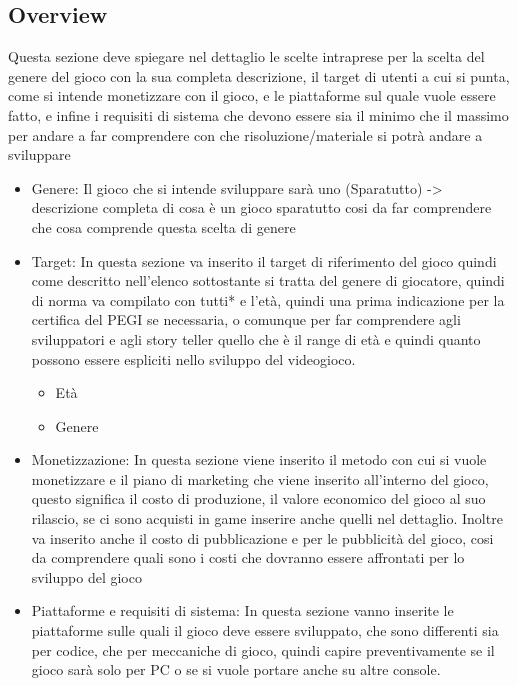 \documentclass{report}
\begin{document}
\subsection{Overview}

Questa sezione deve spiegare nel dettaglio le scelte intraprese per la scelta del genere del gioco con la sua completa descrizione, il target di utenti a cui si punta, come si intende monetizzare con il gioco, e le piattaforme sul quale vuole essere fatto, e infine i requisiti di sistema che devono essere sia il minimo che il massimo per andare a far comprendere con che risoluzione/materiale si potrà andare a sviluppare
\begin{itemize}
  \item Genere: Il gioco che si intende sviluppare sarà uno (Sparatutto) -> descrizione completa di cosa è un gioco sparatutto cosi da far comprendere che cosa comprende questa scelta di genere
  \item Target: In questa sezione va inserito il target di riferimento del gioco quindi come descritto nell'elenco sottostante si tratta del genere di giocatore, quindi di norma va compilato con tutti* e l'età, quindi una prima indicazione per la certifica del PEGI se necessaria, o comunque per far comprendere agli sviluppatori e agli story teller quello che è il range di età e quindi quanto possono essere espliciti nello sviluppo del videogioco.
  \begin{itemize}
    \item Età
    \item Genere
  \end{itemize}
  \item Monetizzazione:
  In questa sezione viene inserito il metodo con cui si vuole monetizzare e il piano di marketing che viene inserito all'interno del gioco, questo significa il costo di produzione, il valore economico del gioco al suo rilascio, se ci sono acquisti in game inserire anche quelli nel dettaglio. Inoltre va inserito anche il costo di pubblicazione e per le pubblicità del gioco, cosi da comprendere quali sono i costi che dovranno essere affrontati per lo sviluppo del gioco
  \item Piattaforme e requisiti di sistema:
  In questa sezione vanno inserite le piattaforme sulle quali il gioco deve essere sviluppato, che sono differenti sia per codice, che per meccaniche di gioco, quindi capire preventivamente se il gioco sarà solo per PC o se si vuole portare anche su altre console.


\end{itemize}
\end{document}
